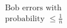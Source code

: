 \documentclass[preview]{standalone}
\begin{document}
\begin{align*}
\text{Bob errors with }\\ \text{probability } \leq \frac{1}{n}
\end{align*}
\end{document}
